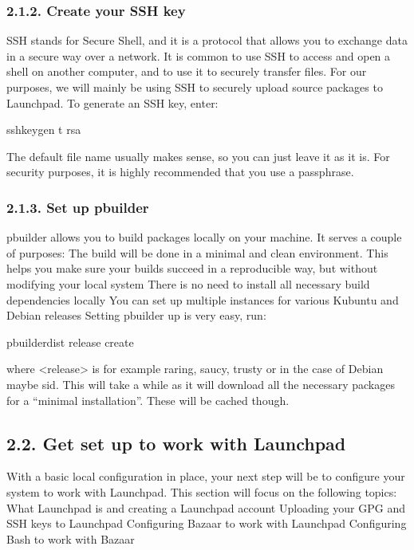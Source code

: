 \documentclass[letterpaper,10pt,english]{sphinxmanual}
\begin{document}
\subsubsection{2.1.2. Create your SSH key}
\label{\detokenize{docs/packaging_guide/getting_started:create-your-ssh-key}}
SSH stands for Secure Shell, and it is a protocol that allows you to exchange data in a secure way over a network. It is common to use SSH to access and open a shell on another computer, and to use it to securely transfer files. For our purposes, we will mainly be using SSH to securely upload source packages to Launchpad.
To generate an SSH key, enter:

\begin{sphinxVerbatim}[commandchars=\\\{\}]
\PYGZdl{} ssh\PYGZhy{}keygen \PYGZhy{}t rsa
\end{sphinxVerbatim}

The default file name usually makes sense, so you can just leave it as it is. For security purposes, it is highly recommended that you use a passphrase.


\subsubsection{2.1.3. Set up pbuilder}
\label{\detokenize{docs/packaging_guide/getting_started:set-up-pbuilder}}
pbuilder allows you to build packages locally on your machine. It serves a couple of purposes:
The build will be done in a minimal and clean environment. This helps you make sure your builds succeed in a reproducible way, but without modifying your local system
There is no need to install all necessary build dependencies locally
You can set up multiple instances for various Kubuntu and Debian releases
Setting pbuilder up is very easy, run:

\begin{sphinxVerbatim}[commandchars=\\\{\}]
\PYGZdl{} pbuilder\PYGZhy{}dist \PYGZlt{}release\PYGZgt{} create
\end{sphinxVerbatim}

where \textless{}release\textgreater{} is for example raring, saucy, trusty or in the case of Debian maybe sid. This will take a while as it will download all the necessary packages for a “minimal installation”. These will be cached though.


\subsection{2.2. Get set up to work with Launchpad}
\label{\detokenize{docs/packaging_guide/getting_started:get-set-up-to-work-with-launchpad}}
With a basic local configuration in place, your next step will be to configure your system to work with Launchpad. This section will focus on the following topics:
What Launchpad is and creating a Launchpad account
Uploading your GPG and SSH keys to Launchpad
Configuring Bazaar to work with Launchpad
Configuring Bash to work with Bazaar
\end{document}
